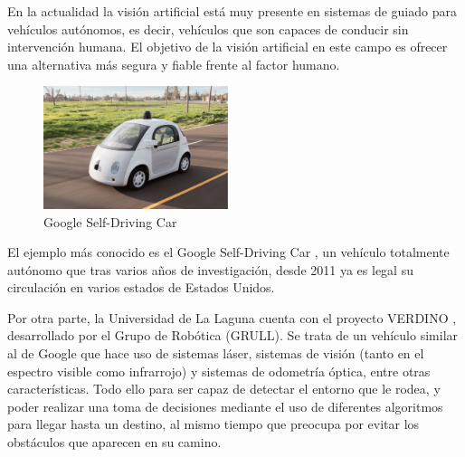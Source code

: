 


En la actualidad la visión artificial está muy presente en sistemas de guiado
para vehículos autónomos, es decir, vehículos que son capaces de conducir sin
intervención humana. El objetivo de la visión artificial en este campo es
ofrecer una alternativa más segura y fiable frente al factor humano.

\begin{figure}
  \vspace{-20pt}
  \begin{center}
    \includegraphics[width=0.48\textwidth]{images/cap1/GoogleSelf-DrivingCar.eps}
  \end{center}
  \vspace{-20pt}
  \caption{Google Self-Driving Car}
  \vspace{-10pt}
  \label{fig:GoogleSelf-DrivingCar}
\end{figure}

El ejemplo más conocido es el Google Self-Driving Car \cite{GoogleCar}, un
vehículo totalmente autónomo que tras varios años de investigación, desde 2011
ya es legal su circulación en varios estados de Estados Unidos.

Por otra parte, la Universidad de La Laguna cuenta con el proyecto VERDINO
\cite{ProjectVerdino}, desarrollado por el Grupo de Robótica (GRULL). Se trata
de un vehículo similar al de Google que hace uso de sistemas láser, sistemas de
visión (tanto en el espectro visible como infrarrojo) y sistemas de odometría
óptica, entre otras características. Todo ello para ser capaz de detectar el
entorno que le rodea, y poder realizar una toma de decisiones mediante el uso de
diferentes algoritmos para llegar hasta un destino, al mismo tiempo que preocupa
por evitar los obstáculos que aparecen en su camino.

